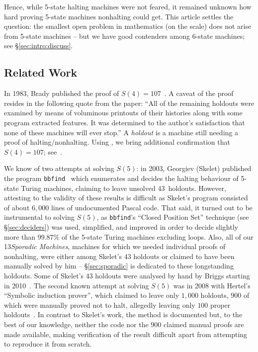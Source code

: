 \documentclass[sigconf,screen]{acmart}
\theoremstyle{definition} %
\numberwithin{equation}{section}
\theoremstyle{definition} %
\newcommand{\BBtheFourth}{107}
\newcommand{\numSporadic}{13\xspace}
\begin{document}
Hence, while 5-state halting machines were not feared, it remained unknown how hard proving 5-state machines nonhalting could get. This article settles the question: the smallest open problem in mathematics (on the \BBfull scale) does not arise from 5-state machines -- but we have good contenders among 6-state machines; see \S\ref{sec:intro:discuss}.

\subsection{Related Work}\label{sec:intro:rw}

In 1983, Brady published the proof of $S(4) = \BBtheFourth$~\cite{Brady83}. A caveat of the proof resides in the following quote from the paper: ``All of the remaining holdouts were examined by means of voluminous printouts of their histories along with some program extracted features. It was determined to the author's satisfaction that none of these machines will ever stop.'' A \textit{holdout} is a machine still needing a proof of halting/nonhalting. Using \Coq, we bring additional confirmation that $S(4) = \BBtheFourth$; see~\cite{BB5}.

We know of two attempts at solving $S(5)$: in 2003, Georgiev (Skelet) published the program \texttt{bbfind}~\cite{Skelet_bbfind} which enumerates and decides the halting behaviour of 5-state Turing machines, claiming to leave unsolved 43~holdouts. However, attesting to the validity of these results is difficult as Skelet's program consisted of about $6{,}000$ lines of undocumented Pascal code. That said, it turned out to be instrumental to solving $S(5)$, as \texttt{bbfind}'s ``Closed Position Set'' technique (see \S\ref{sec:deciders}) was used, simplified, and improved in order to decide slightly more than 99.87\% of the 5-state Turing machines excluding loops. Also, all of our \numSporadic \textit{Sporadic Machines}, \ie machines for which we needed individual proofs of nonhalting, were either among Skelet's 43 holdouts or claimed to have been manually solved by him -- \S\ref{sec:sporadic} is dedicated to these longstanding holdouts. Some of Skelet's 43 holdouts were analysed by hand by Briggs starting in 2010~\cite{DanBriggs}. The second known attempt at solving $S(5)$ was in 2008 with Hertel's ``Symbolic induction prover'', which claimed to leave only $1{,}000$ holdouts, $900$ of which were manually proved not to halt, allegedly leaving only $100$ proper holdouts~\cite{Hertel}. In contrast to Skelet's work, the method is documented but, to the best of our knowledge, neither the code nor the 900 claimed manual proofs are made available, making verification of the result difficult apart from attempting to reproduce it from scratch.
\end{document}
